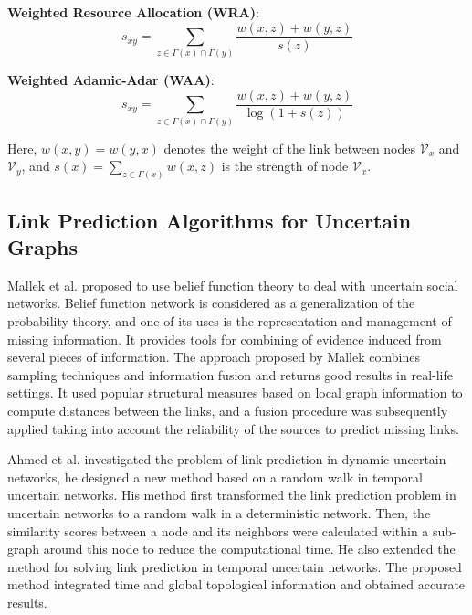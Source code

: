 \documentclass[\main/thesis.tex]{subfiles}
\begin{document}
\textbf{Weighted Resource Allocation (WRA)}:
\begin{equation}
s_{xy}=\sum_{z\in \Gamma(x)\cap\Gamma(y)}\frac{w(x,z)+w(y,z)}{s(z)}
\end{equation}

\textbf{Weighted Adamic-Adar (WAA)}:
\begin{equation}
s_{xy}=\sum_{z\in \Gamma(x)\cap\Gamma(y)}\frac{w(x,z)+w(y,z)}{\log(1+s(z))}
\end{equation}

Here, $w(x, y) = w(y, x)$ denotes the weight of the link between nodes $\mathcal{V}_x$ and $\mathcal{V}_y$, and $s(x)=\sum_{z\in\Gamma(x)}w(x,z)$ is the strength of node $\mathcal{V}_x$.

\subsection{Link Prediction Algorithms for Uncertain Graphs}
Mallek et al. \cite{mallek2016evidential} proposed to use belief function theory to deal with uncertain social networks. Belief function network is considered as a generalization of the probability theory, and one of its uses is the representation and management of missing information. It provides tools for combining of evidence induced from several pieces of information. The approach proposed by Mallek combines sampling techniques and information fusion and returns good results in real-life settings. It used popular structural measures based on local graph information to compute distances between the links, and a fusion procedure was subsequently applied taking into account the reliability of the sources to predict missing links.

Ahmed et al. \cite{ahmed2016efficient} investigated the problem of link prediction in dynamic uncertain networks, he designed a new method based on a random walk in temporal uncertain networks. His method first transformed the link prediction problem in uncertain networks to a random walk in a deterministic network. Then, the similarity scores between a node and its neighbors were calculated within a sub-graph around this node to reduce the computational time. He also extended the method for solving link prediction in temporal uncertain networks. The proposed method integrated time and global topological information and obtained accurate results.

\newpage
\end{document}
